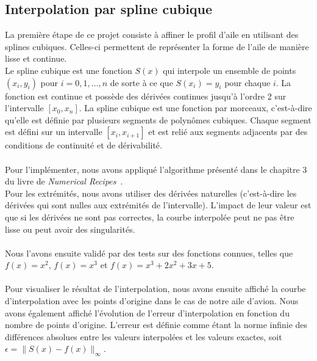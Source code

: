 \documentclass{article}
\begin{document}
\subsection{Interpolation par spline cubique}
La première étape de ce projet consiste à affiner le profil d'aile en utilisant des splines cubiques. Celles-ci permettent de représenter la forme de l'aile de manière lisse et continue. \\
Le spline cubique est une fonction $S(x)$ qui interpole un ensemble de points $(x_i, y_i)$ pour $i=0, 1, \ldots, n$ de sorte à ce que $S(x_i) = y_i$ pour chaque $i$. La fonction est continue et possède des dérivées continues jusqu'à l'ordre 2 sur l'intervalle $[x_0, x_n]$.
La spline cubique est une fonction par morceaux, c'est-à-dire qu'elle est définie par plusieurs segments de polynômes cubiques. Chaque segment est défini sur un intervalle $[x_i, x_{i+1}]$ et est relié aux segments adjacents par des conditions de continuité et de dérivabilité. \\ \\
Pour l'implémenter, nous avons appliqué l'algorithme présenté dans le chapitre 3 du livre de \textit{Numerical Recipes}~\cite{press1992numerical}. 
\\
Pour les extrémités, nous avons utiliser des dérivées naturelles (c'est-à-dire les dérivées qui sont nulles aux extrémités de l'intervalle). L'impact de leur valeur est que si les dérivées ne sont pas correctes, la courbe interpolée peut ne pas être lisse ou peut avoir des singularités.\\ \\
Nous l'avons ensuite validé par des tests sur des fonctions connues, telles que $f(x)=x^2$, $f(x)=x^3$ et $f(x)=x^3+2x^2+3x+5$.\\ \\
Pour visualiser le résultat de l'interpolation, nous avons ensuite affiché la courbe d'interpolation avec les points d'origine dans le cas de notre aile d'avion. Nous avons également affiché l'évolution de l'erreur d'interpolation en fonction du nombre de points d'origine. L'erreur est définie comme étant la norme infinie des différences absolues entre les valeurs interpolées et les valeurs exactes, soit $\epsilon = \|S(x) - f(x)\|_{\infty}$.
\end{document}
